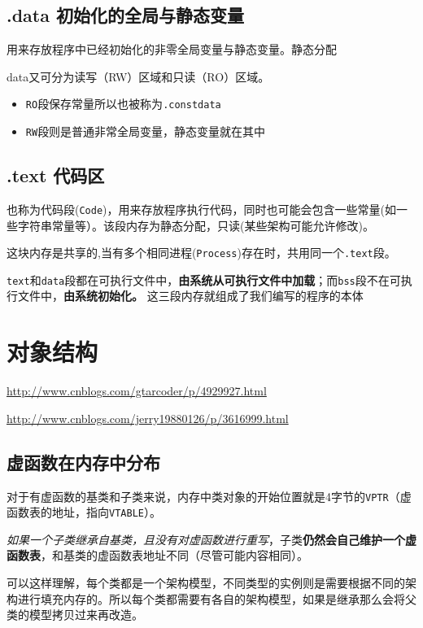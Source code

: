 \documentclass[UTF8,a4paper,12pt]{ctexbook} %
\begin{document}
		\subsection{.data 初始化的全局与静态变量}
			用来存放程序中已经初始化的非零全局变量与静态变量。静态分配
			
			data又可分为读写（RW）区域和只读（RO）区域。 
			\begin{itemize}[itemindent = 2em]
				\item \verb|RO|段保存常量所以也被称为\verb|.constdata |
				\item \verb|RW|段则是普通非常全局变量，静态变量就在其中
			\end{itemize}
			
		\subsection{.text 代码区}
			也称为代码段(\verb|Code|)，用来存放程序执行代码，同时也可能会包含一些常量(如一些字符串常量等）。该段内存为静态分配，只读(某些架构可能允许修改)。 
			
			这块内存是共享的,当有多个相同进程(\verb|Process|)存在时，共用同一个\verb|.text|段。
			
			\verb|text|和\verb|data|段都在可执行文件中，\textbf{由系统从可执行文件中加载}；而\verb|bss|段不在可执行文件中，\textbf{由系统初始化。} 
			这三段内存就组成了我们编写的程序的本体
	\section{对象结构}
		\url{http://www.cnblogs.com/gtarcoder/p/4929927.html}
		
		\url{http://www.cnblogs.com/jerry19880126/p/3616999.html}
		
		\subsection{虚函数在内存中分布}
			对于有虚函数的基类和子类来说，内存中类对象的开始位置就是4字节的\verb|VPTR|（虚函数表的地址，指向\verb|VTABLE|）。
			
			\textit{如果一个子类继承自基类，且没有对虚函数进行重写}，子类\textbf{仍然会自己维护一个虚函数表}，和基类的虚函数表地址不同（尽管可能内容相同）。 
			
			\color{blue}可以这样理解，每个类都是一个架构模型，不同类型的实例则是需要根据不同的架构进行填充内存的。所以每个类都需要有各自的架构模型，如果是继承那么会将父类的模型拷贝过来再改造。
			\color{black}
			
\end{document}
